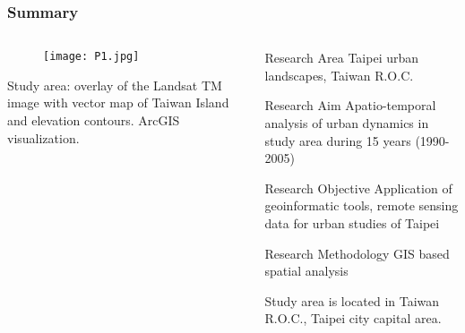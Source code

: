 \documentclass[pdflatex,compress,8pt,
	xcolor={dvipsnames,dvipsnames,svgnames,x11names,table},
	hyperref={	
	breaklinks = true, 
	pdfauthor={Lemenkova Polina}, 
	pdfsubject={Preentation}, 
	pdfcreator={Lemenkova Polina}, 
	pdfproducer={Lemenkova Polina}, 
	colorlinks=true,
	linkcolor=Gold1, 
	citecolor=NavyBlue, 
	urlcolor = NavyBlue, 
	breaklinks = true}]{beamer}
\begin{document}
\begin{frame}\frametitle{Summary}
\begin{minipage}[0.4\textheight]{\textwidth}
\begin{columns}[T]
\begin{column}{0.5\textwidth}
\begin{figure}[H]
	\centering
		\texttt{[image: P1.jpg]}
\end{figure}
\small{Study area: overlay of the Landsat TM image with vector map of Taiwan Island and elevation contours. ArcGIS visualization.}
\end{column}
\begin{column}{0.5\textwidth}
\begin{alertblock}{Research Area}
Taipei urban landscapes, Taiwan R.O.C.
\end{alertblock}

\begin{block}{Research Aim}
Apatio-temporal analysis of urban dynamics in study area during 15 years (1990-2005)
\end{block}

\begin{alertblock}{Research Objective}
Application of geoinformatic tools, remote sensing data for urban studies of Taipei
\end{alertblock}

\begin{block}{Research Methodology}
GIS based spatial analysis
\end{block}

Study area is located in Taiwan R.O.C., Taipei city capital area. 
\end{column}
\end{columns}
\end{minipage}
\end{frame}
\end{document}
